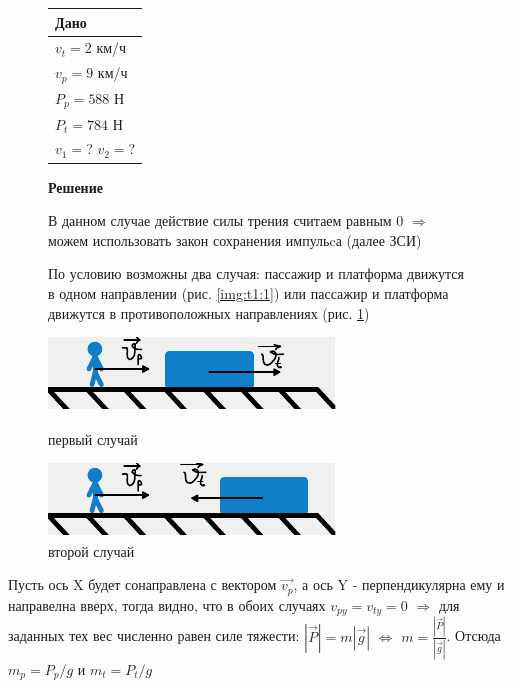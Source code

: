 \documentclass[a4paper,12pt]{article}
\begin{document}
    \begin{figure}[H]
            \begin{tabular}{p{} |}
                \textbf{Дано} \\
                \hline
                $v_t = 2$ км/ч \\
                $v_p = 9$ км/ч \\
                $P_p = 588$ Н \\
                $P_t = 784$ Н \\
                \hline
                $v_1 = $? $v_2 = $?
            \end{tabular}
        \endminipage
            \textbf{Решение}

            В данном случае действие силы трения считаем равным $0$ $\Rightarrow$ можем
            использовать закон сохранения импульcа (далее ЗСИ)

            По условию возможны два случая: пассажир и платформа движутся в одном направлении
            (рис. \ref{img:t1:1}) или пассажир и платформа движутся в противоположных направлениях
            (рис. \ref{img:t1:2})
        \endminipage
    \end{figure}
    \begin{figure}[H]
        \centering
            \centering
            \includegraphics[scale=1.3]{01_01}
            \caption{первый случай}
            \label{img:t1:1}
        \endminipage
            \centering
            \includegraphics[scale=1.3]{01_02}
            \caption{второй случай}
            \label{img:t1:2}
        \endminipage
    \end{figure}

    Пусть ось X будет сонаправлена с вектором $\vec{v_p}$, а ось Y - перпендикулярна ему и направелна вверх,
    тогда видно, что в обоих случаях $v_{py} = v_{ty} = 0$ $\Rightarrow$ для заданных тех вес численно
    равен силе тяжести: $|\vec{P}| = m|\vec{g}|$ $\Leftrightarrow$ $m = \frac{|\vec{P}|}{|\vec{g}|}$. Отсюда
    $m_p = P_p / g$ и $m_t = P_t / g$
\end{document}
